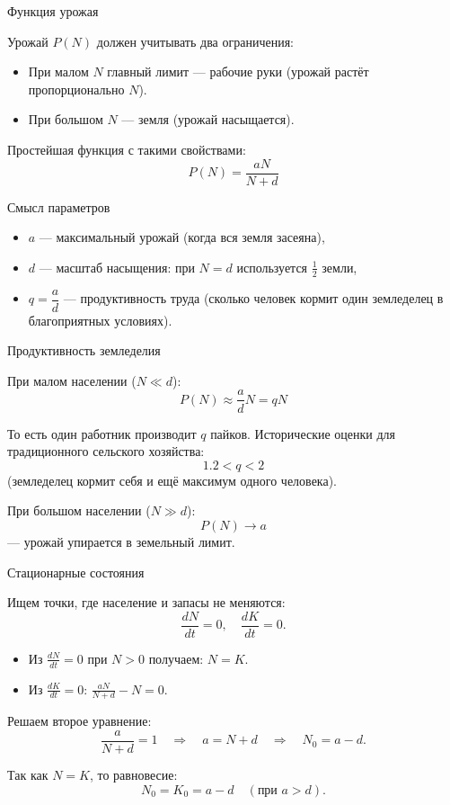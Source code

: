 \documentclass[12pt]{beamer}
\begin{document}
\begin{frame}{Функция урожая}

Урожай $P(N)$ должен учитывать два ограничения:
\begin{itemize}
    \item При малом $N$ главный лимит — рабочие руки (урожай растёт пропорционально $N$).
    \item При большом $N$ — земля (урожай насыщается).
\end{itemize}

Простейшая функция с такими свойствами:
\[
P(N) = \frac{aN}{N+d}
\]

\begin{exampleblock}{Смысл параметров}
\begin{itemize}
    \item $a$ — максимальный урожай (когда вся земля засеяна),
    \item $d$ — масштаб насыщения: при $N = d$ используется $\frac{1}{2}$ земли,
    \item $q = \dfrac{a}{d}$ — продуктивность труда (сколько человек кормит один земледелец в благоприятных условиях).
\end{itemize}
\end{exampleblock}

\end{frame}

\begin{frame}{Продуктивность земледелия}

При малом населении ($N \ll d$):
\[
P(N) \approx \frac{a}{d} N = qN
\]

То есть один работник производит $q$ пайков. Исторические оценки для традиционного сельского хозяйства:
\[
1.2 < q < 2
\]
(земледелец кормит себя и ещё максимум одного человека).

При большом населении ($N \gg d$):
\[
P(N) \to a
\]
— урожай упирается в земельный лимит.

\end{frame}

\begin{frame}{Стационарные состояния}

Ищем точки, где население и запасы не меняются:
\[
\frac{dN}{dt}=0,\quad \frac{dK}{dt}=0.
\]

\begin{itemize}
    \item Из $\frac{dN}{dt}=0$ при $N>0$ получаем: $N = K$.
    \item Из $\frac{dK}{dt}=0$: $\displaystyle \frac{aN}{N+d} - N = 0$.
\end{itemize}

Решаем второе уравнение:
\[
\frac{a}{N+d} = 1 \quad\Rightarrow\quad a = N + d \quad\Rightarrow\quad N_0 = a - d.
\]

Так как $N = K$, то равновесие:
\[
N_0 = K_0 = a - d \quad (\text{при } a > d).
\]
\end{frame}
\end{document}

